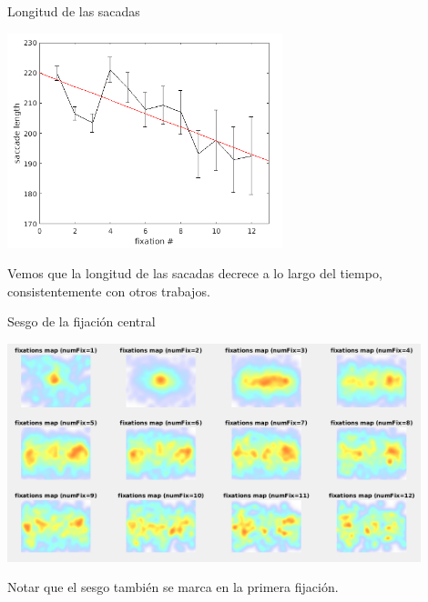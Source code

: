 \documentclass[compress]{beamer}
\begin{document}
\begin{frame}{Longitud de las sacadas}
\begin{center}
\includegraphics[width=0.6\textwidth]{images/mean-sacclen.png}
\end{center}

Vemos que la longitud de las sacadas decrece a lo largo del tiempo, consistentemente con otros trabajos.
\end{frame}

\begin{frame}{Sesgo de la fijación central}
\begin{center}
\includegraphics[width=0.9\textwidth]{images/heatmap-per-fix.png}
\end{center}

Notar que el sesgo también se marca en la primera fijación. \end{frame}



\end{document}
